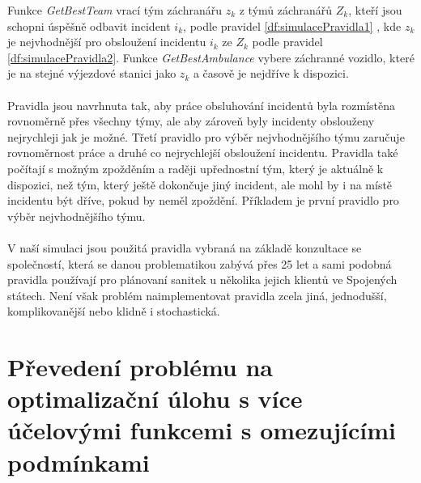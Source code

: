 Funkce \textit{GetBestTeam}\label{df:getBestTeam} vrací tým záchranářu $z_k$ z týmů záchranářů $Z_k$, kteří jsou schopni úspěšně odbavit incident $i_k$, podle pravidel \ref{df:simulacePravidla1}
, kde $z_k$ je nejvhodnější pro obsloužení incidentu $i_k$ ze $Z_k$ podle pravidel \ref{df:simulacePravidla2}. 
Funkce \textit{GetBestAmbulance}\label{df:getBestAmbulance} vybere záchranné vozidlo, které je na stejné výjezdové stanici jako $z_k$ a časově je nejdříve k dispozici.
\\
\\
Pravidla jsou navrhnuta tak, aby práce obsluhování incidentů byla rozmístěna rovnoměrně přes všechny týmy, ale aby zároveň byly incidenty obslouženy nejrychleji jak je možné.
Třetí pravidlo pro výběr nejvhodnějšího týmu zaručuje rovnoměrnost práce a druhé co nejrychlejší obsloužení incidentu.
Pravidla také počítají s možným zpožděním a raději upřednostní tým, který je aktuálně k dispozici, než tým, který ještě dokončuje jiný incident, ale mohl by i na místě incidentu
být dříve, pokud by neměl zpoždění. Příkladem je první pravidlo pro výběr nejvhodnějšího týmu.
\\
\\
V naší simulaci jsou použitá pravidla vybraná na základě konzultace se společností, která se danou problematikou zabývá přes 25 let a sami podobná pravidla používají pro plánovaní sanitek
u několika jejich klientů ve Spojených státech.
Není však problém naimplementovat pravidla zcela jiná, jednodušší, komplikovanější nebo klidně i stochastická.

\section{Převedení problému na optimalizační úlohu s více účelovými funkcemi s omezujícími podmínkami}

